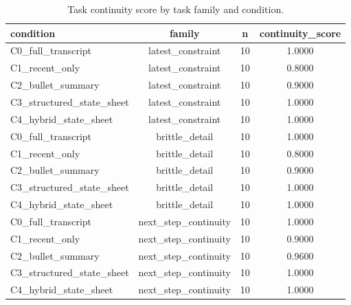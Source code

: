 \begin{table}[t]
\centering
\begin{tabular}{lccc}
\hline
condition & family & n & continuity_score \\
\hline
C0_full_transcript & latest_constraint & 10 & 1.0000 \\
C1_recent_only & latest_constraint & 10 & 0.8000 \\
C2_bullet_summary & latest_constraint & 10 & 0.9000 \\
C3_structured_state_sheet & latest_constraint & 10 & 1.0000 \\
C4_hybrid_state_sheet & latest_constraint & 10 & 1.0000 \\
C0_full_transcript & brittle_detail & 10 & 1.0000 \\
C1_recent_only & brittle_detail & 10 & 0.8000 \\
C2_bullet_summary & brittle_detail & 10 & 0.9000 \\
C3_structured_state_sheet & brittle_detail & 10 & 1.0000 \\
C4_hybrid_state_sheet & brittle_detail & 10 & 1.0000 \\
C0_full_transcript & next_step_continuity & 10 & 1.0000 \\
C1_recent_only & next_step_continuity & 10 & 0.9000 \\
C2_bullet_summary & next_step_continuity & 10 & 0.9600 \\
C3_structured_state_sheet & next_step_continuity & 10 & 1.0000 \\
C4_hybrid_state_sheet & next_step_continuity & 10 & 1.0000 \\
\hline
\end{tabular}
\caption{Task continuity score by task family and condition.}
\label{tab:family-breakdown}
\end{table}
